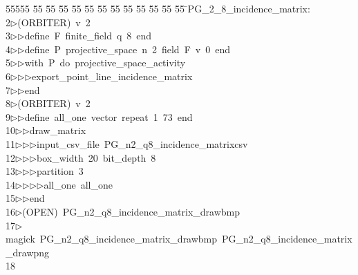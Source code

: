 %
%
\begin{tabbing}
55555 \= 55 \= 55 \= 55 \= 55 \= 55 \= 55 \= 55 \= 55 \= 55 \= 55 \= 55 \= 55 \= \>PG\_2\_8\_incidence\_matrix:\\[0pt]
2\>$\triangleright$\>(ORBITER)\ v\ 2\ \\[0pt]
3\>$\triangleright$\>$\triangleright$\>define\ F\ finite\_field\ q\ 8\ end\ \\[0pt]
4\>$\triangleright$\>$\triangleright$\>define\ P\ projective\_space\ n\ 2\ field\ F\ v\ 0\ end\ \\[0pt]
5\>$\triangleright$\>$\triangleright$\>with\ P\ do\ projective\_space\_activity\ \\[0pt]
6\>$\triangleright$\>$\triangleright$\>$\triangleright$\>export\_point\_line\_incidence\_matrix\ \\[0pt]
7\>$\triangleright$\>$\triangleright$\>end\\[0pt]
8\>$\triangleright$\>(ORBITER)\ v\ 2\ \\[0pt]
9\>$\triangleright$\>$\triangleright$\>define\ all\_one\ vector\ repeat\ 1\ 73\ end\ \\[0pt]
10\>$\triangleright$\>$\triangleright$\>draw\_matrix\ \\[0pt]
11\>$\triangleright$\>$\triangleright$\>$\triangleright$\>input\_csv\_file\ PG\_n2\_q8\_incidence\_matrixcsv\ \\[0pt]
12\>$\triangleright$\>$\triangleright$\>$\triangleright$\>box\_width\ 20\ bit\_depth\ 8\ \\[0pt]
13\>$\triangleright$\>$\triangleright$\>$\triangleright$\>partition\ 3\ \\[0pt]
14\>$\triangleright$\>$\triangleright$\>$\triangleright$\>$\triangleright$\>all\_one\ all\_one\ \\[0pt]
15\>$\triangleright$\>$\triangleright$\>end\\[0pt]
16\>$\triangleright$\>(OPEN)\ PG\_n2\_q8\_incidence\_matrix\_drawbmp\\[0pt]
17\>$\triangleright$\>magick\ PG\_n2\_q8\_incidence\_matrix\_drawbmp\ PG\_n2\_q8\_incidence\_matrix\_drawpng\\[0pt]
18\>\end{tabbing}
